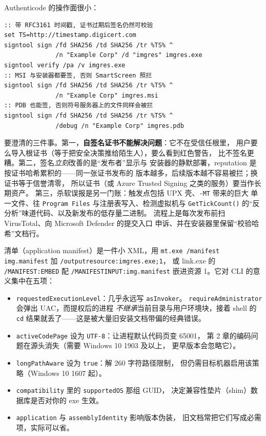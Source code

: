 \documentclass[12pt,a4paper,fontset=fandol]{ctexbook}
\newcommand{\Fn}[1]{\texttt{#1()}}
\newcommand{\Tp}[1]{\texttt{#1}}
\newcommand{\Short}[1]{\texttt{-#1}}
\begin{document}
Authenticode 的操作面很小：

\begin{lstlisting}[style=batchstyle,caption={签名、校验与时间戳（cmd）}]
:: 带 RFC3161 时间戳, 证书过期后签名仍然可校验
set TS=http://timestamp.digicert.com
signtool sign /fd SHA256 /td SHA256 /tr %TS% ^
              /n "Example Corp" /d "imgres" imgres.exe
signtool verify /pa /v imgres.exe
:: MSI 与安装器都要签, 否则 SmartScreen 照拦
signtool sign /fd SHA256 /td SHA256 /tr %TS% ^
              /n "Example Corp" imgres.msi
:: PDB 也能签, 否则符号服务器上的文件同样会被拦
signtool sign /fd SHA256 /td SHA256 /tr %TS% ^
              /debug /n "Example Corp" imgres.pdb
\end{lstlisting}

要澄清的三件事。第一，\textbf{自签名证书不能解决问题}：它不在受信任根里，
用户要么导入根证书（等于把安全决策推给陌生人），要么看到红色警告，
比不签名更糟。第二，签名\emph{立刻}改善的是``发布者''显示与
安装器的静默部署，reputation 是按证书哈希累积的——同一张证书发布的
版本越多，后续版本越不容易被拦；换证书等于信誉清零，
所以证书（或 Azure Trusted Signing 之类的服务）要当作长期资产。
第三，杀软误报是另一门账：触发点包括 UPX 壳、\Short{MT} 带来的巨大
单一文件、往 \Tp{Program Files} 与注册表写入、检测虚拟机与
\Fn{GetTickCount} 的``反分析''味道代码、以及新发布的低存量二进制。
流程上是每次发布前扫 VirusTotal、向 Microsoft Defender 的提交入口
申诉、并在安装器里保留``校验哈希''文档行。

清单（application manifest）是一件小 XML，用
\lstinline|mt.exe /manifest img.manifest| 加
\lstinline|/outputresource:imgres.exe;1|，
或 link.exe 的 \lstinline|/MANIFEST:EMBED| 配
\lstinline|/MANIFESTINPUT:img.manifest|
嵌进资源 1。它对 CLI 的意义集中在五项：

\begin{itemize}
\item \Tp{requestedExecutionLevel}：几乎永远写 \Tp{asInvoker}。
      \Tp{requireAdministrator} 会弹出 UAC，而提权后的进程
      \emph{不继承}当前目录与用户环境块，接着 shell 的
      \Tp{cd} 结果就丢了——这是被大量旧安装文档带偏的经典错误。
\item \Tp{activeCodePage} 设为 \Tp{UTF-8}：让进程默认代码页变 65001，
      第 2 章的编码问题在源头消失（需要 Windows 10 1903 及以上，
      更早版本会忽略它）。
\item \Tp{longPathAware} 设为 \Tp{true}：解 260 字符路径限制，
      但仍需目标机器启用该策略（Windows 10 1607 起）。
\item \Tp{compatibility} 里的 \Tp{supportedOS} 那组 GUID，
      决定兼容性垫片（shim）数据库是否对你的 exe 生效。
\item \Tp{application} 与 \Tp{assemblyIdentity} 影响版本伪装，
      旧文档常把它们写成必需项，实际可以省。
\end{itemize}
\end{document}
